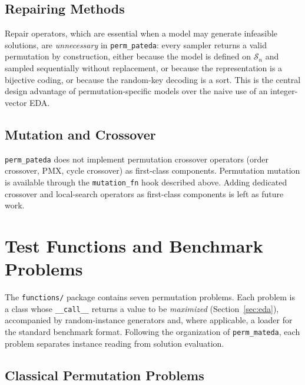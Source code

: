 \documentclass[a4paper,11pt]{article}
\begin{document}
\subsection{Repairing Methods}

Repair operators, which are essential when a model may generate infeasible
solutions, are \emph{unnecessary} in \texttt{perm\_pateda}: every sampler returns
a valid permutation by construction, either because the model is defined on
$\mathcal{S}_n$ and sampled sequentially without replacement, or because the
representation is a bijective coding, or because the random-key decoding is a
sort.  This is the central design advantage of permutation-specific models over
the naive use of an integer-vector EDA.

\subsection{Mutation and Crossover}

\texttt{perm\_pateda} does not implement permutation crossover operators
(order crossover, PMX, cycle crossover) as first-class components.  Permutation
mutation is available through the \texttt{mutation\_fn} hook described above.
Adding dedicated crossover and local-search operators as first-class components
is left as future work.

\section{Test Functions and Benchmark Problems}
\label{sec:functions}

The \texttt{functions/} package contains seven permutation problems.  Each
problem is a class whose \texttt{\_\_call\_\_} returns a value to be
\emph{maximized} (Section~\ref{sec:eda}), accompanied by random-instance
generators and, where applicable, a loader for the standard benchmark format.
Following the organization of \texttt{perm\_mateda}, each problem separates
instance reading from solution evaluation.

\subsection{Classical Permutation Problems}
\end{document}
